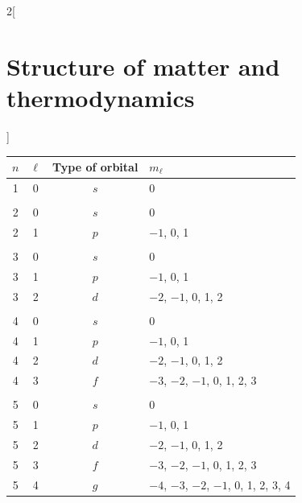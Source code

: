 \documentclass[../../../main_physics.tex]{subfiles}
\begin{document}
\begin{multicols}{2}[\section{Structure of matter and thermodynamics}]
\begin{definition}[Spin]
  \end{definition}
  \begin{center}
    \begin{minipage}{\linewidth}
      \centering
      \begin{tabular}{cccl}
        \hline
        \hline
        $n$ & $\ell$ & Type of orbital & $m_\ell$                              \\
        \hline
        1   & 0      & $s$             & 0                                     \\
            &        &                 &                                       \\
        2   & 0      & $s$             & 0                                     \\
        2   & 1      & $p$             & $-1$, 0, 1                            \\
            &        &                 &                                       \\
        3   & 0      & $s$             & 0                                     \\
        3   & 1      & $p$             & $-1$, 0, 1                            \\
        3   & 2      & $d$             & $-2$, $-1$, 0, 1, 2                   \\
            &        &                 &                                       \\
        4   & 0      & $s$             & 0                                     \\
        4   & 1      & $p$             & $-1$, 0, 1                            \\
        4   & 2      & $d$             & $-2$, $-1$, 0, 1, 2                   \\
        4   & 3      & $f$             & $-3$, $-2$, $-1$, 0, 1, 2, 3          \\
            &        &                 &                                       \\
        5   & 0      & $s$             & 0                                     \\
        5   & 1      & $p$             & $-1$, 0, 1                            \\
        5   & 2      & $d$             & $-2$, $-1$, 0, 1, 2                   \\
        5   & 3      & $f$             & $-3$, $-2$, $-1$, 0, 1, 2, 3          \\
        5   & 4      & $g$             & $-4$, $-3$, $-2$, $-1$, 0, 1, 2, 3, 4 \\
        \hline
        \hline
      \end{tabular}
    \end{minipage}
  \end{center}

\end{multicols}
\end{document}

